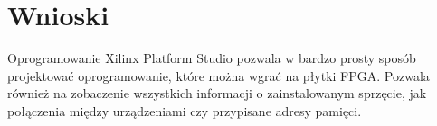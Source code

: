 \section{Wnioski}
Oprogramowanie Xilinx Platform Studio pozwala w bardzo prosty sposób projektować
oprogramowanie, które można wgrać na płytki FPGA. Pozwala również na zobaczenie wszystkich
informacji o zainstalowanym sprzęcie, jak połączenia między urządzeniami czy przypisane adresy
pamięci.

\endinput
